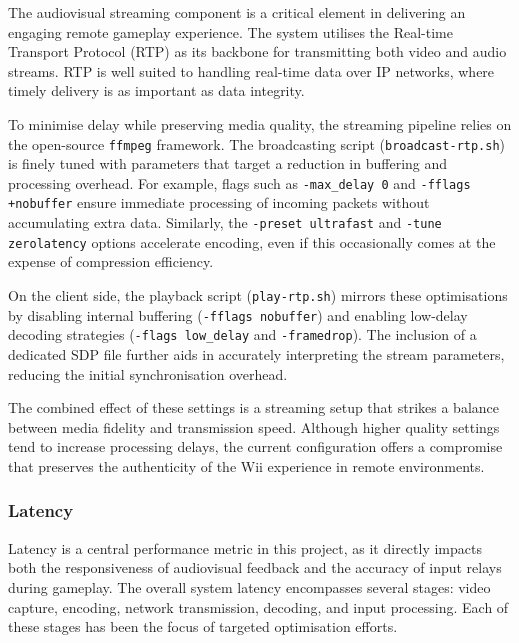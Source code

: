 The audiovisual streaming component is a critical element in delivering an
engaging remote gameplay experience. The system utilises the Real-time Transport
Protocol (RTP) as its backbone for transmitting both video and audio streams.
RTP is well suited to handling real-time data over IP networks,
where timely delivery is as important as data integrity.

To minimise delay while preserving media quality, the streaming pipeline relies
on the open-source \texttt{ffmpeg} framework. The broadcasting script
(\texttt{broadcast-rtp.sh}) is finely tuned with parameters that target a
reduction in buffering and processing overhead. For example, flags such as
\texttt{-max\_delay 0} and \texttt{-fflags +nobuffer} ensure immediate
processing of incoming packets without accumulating extra data. Similarly, the
\texttt{-preset ultrafast} and \texttt{-tune zerolatency} options accelerate
encoding, even if this occasionally comes at the expense of compression
efficiency.

On the client side, the playback script (\texttt{play-rtp.sh}) mirrors these
optimisations by disabling internal buffering (\texttt{-fflags nobuffer}) and
enabling low-delay decoding strategies (\texttt{-flags low\_delay} and
\texttt{-framedrop}). The inclusion of a dedicated SDP file further aids in
accurately interpreting the stream parameters, reducing the initial
synchronisation overhead.

The combined effect of these settings is a streaming setup that strikes a
balance between media fidelity and transmission speed. Although higher quality
settings tend to increase processing delays, the current configuration offers a
compromise that preserves the authenticity of the Wii experience in remote
environments. %

\subsubsection{Latency}

Latency is a central performance metric in this project, as it directly impacts
both the responsiveness of audiovisual feedback and the accuracy of input relays
during gameplay. The overall system latency encompasses several stages: video
capture, encoding, network transmission, decoding, and input processing. Each of
these stages has been the focus of targeted optimisation efforts.

